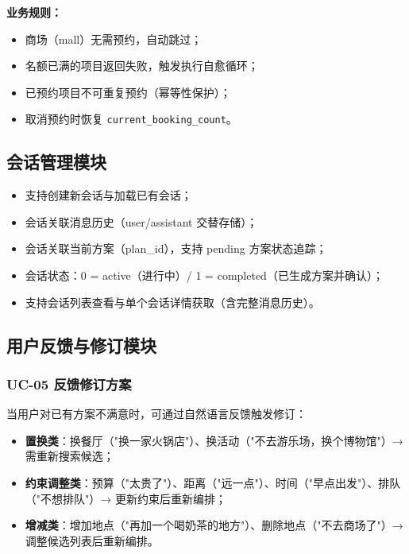 \documentclass[12pt,a4paper]{ctexart}
\begin{document}
\textbf{业务规则：}

\begin{itemize}
  \item 商场（mall）无需预约，自动跳过；
  \item 名额已满的项目返回失败，触发执行自愈循环；
  \item 已预约项目不可重复预约（幂等性保护）；
  \item 取消预约时恢复 \texttt{current\_booking\_count}。
\end{itemize}

\subsection{会话管理模块}

\begin{itemize}
  \item 支持创建新会话与加载已有会话；
  \item 会话关联消息历史（user/assistant 交替存储）；
  \item 会话关联当前方案（plan\_id），支持 pending 方案状态追踪；
  \item 会话状态：0 = active（进行中）/ 1 = completed（已生成方案并确认）；
  \item 支持会话列表查看与单个会话详情获取（含完整消息历史）。
\end{itemize}

\subsection{用户反馈与修订模块}

\subsubsection{UC-05 反馈修订方案}

当用户对已有方案不满意时，可通过自然语言反馈触发修订：

\begin{itemize}
  \item \textbf{置换类}：换餐厅（"换一家火锅店"）、换活动（"不去游乐场，换个博物馆"）→ 需重新搜索候选；
  \item \textbf{约束调整类}：预算（"太贵了"）、距离（"远一点"）、时间（"早点出发"）、排队（"不想排队"）→ 更新约束后重新编排；
  \item \textbf{增减类}：增加地点（"再加一个喝奶茶的地方"）、删除地点（"不去商场了"）→ 调整候选列表后重新编排。
\end{itemize}
\end{document}
